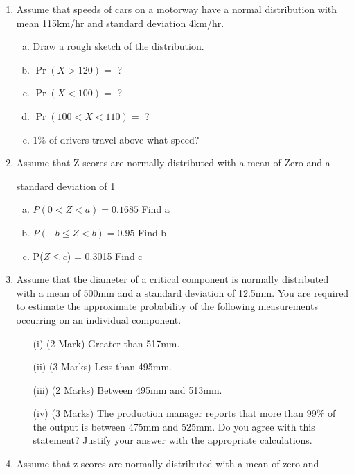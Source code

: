 \documentclass[a4paper,12pt]{article}
\begin{document}
\begin{enumerate}



\item 

Assume that speeds of cars on a motorway have a normal distribution with mean 115km/hr and standard deviation 4km/hr.\\[-0.2cm]

\begin{enumerate}[(a)]

\item Draw a rough sketch of the distribution. \item $\Pr(X>120)=$ ? \item $\Pr(X<100)=$ ? \item $\Pr(100<X<110)=$ ? \item 1\% of drivers travel above what speed?

\end{enumerate}




\item Assume that Z scores are normally distributed with a mean of Zero and a

standard deviation of 1



\begin{enumerate}[(a)]

\item $P (0< Z < a)  =  0.1685$  Find   a 

\item           $ P(- b \leq Z < b) =  0.95$             Find   b

\item             P($Z \leq c$)  =       0.3015  Find   c

\end{enumerate}


\item  Assume that the diameter of a critical component is normally distributed with a mean of 500mm and a standard deviation of 12.5mm. You are required  to estimate the approximate probability of the following measurements occurring on an individual component.
\begin{itemize}
	\item[(i)](2 Mark) Greater than 517mm.
	\item[(ii)](3 Marks) Less than 495mm.
	\item [(iii)](2 Marks) Between 495mm and 513mm.
	\item[(iv)] (3 Marks) The production manager reports that more than 99\% of the output is between 475mm and 525mm. Do you agree with this statement? Justify your answer with the appropriate calculations.
\end{itemize}
\item Assume that z scores are normally distributed with a mean of zero and


\end{enumerate}
\end{document}
